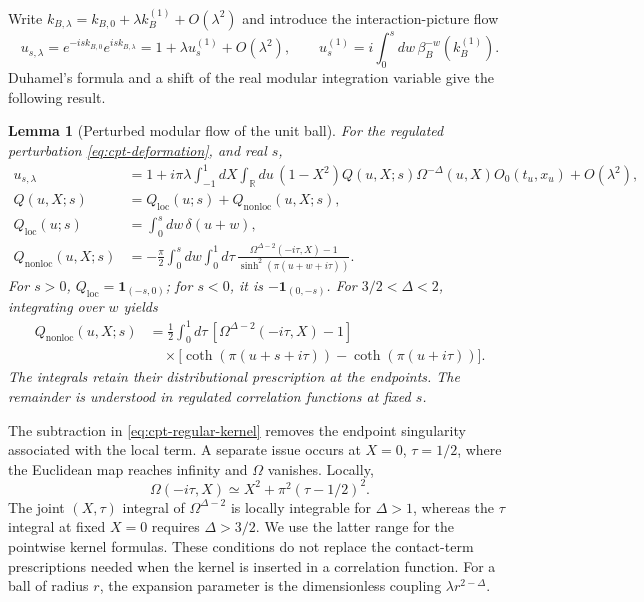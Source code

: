\documentclass[a4paper,11pt]{article}
\newtheorem{lemma}[theorem]{Lemma}
\theoremstyle{definition}
\begin{document}
Write $k_{B,\lambda}=k_{B,0}+\lambda k_B^{(1)}+O(\lambda^2)$ and introduce the interaction-picture flow
\begin{equation}
 u_{s,\lambda}=e^{-is k_{B,0}}e^{is k_{B,\lambda}}
 =1+\lambda u_s^{(1)}+O(\lambda^2),
 \qquad u_s^{(1)}=i\int_0^s dw\,\beta_B^{-w}(k_B^{(1)}).
 \label{eq:cpt-interaction-flow}
\end{equation}
Duhamel's formula and a shift of the real modular integration variable give the following result.
\begin{lemma}[Perturbed modular flow of the unit ball]
\label{lem:cpt-ball-flow}
For the regulated perturbation \eqref{eq:cpt-deformation}, and real $s$,
\begin{align}
 u_{s,\lambda}&=1+i\pi\lambda\int_{-1}^1dX\int_{\mathbb R}du\,
 (1-X^2)Q(u,X;s)\Omega^{-\Delta}(u,X)O_0(t_u,x_u)
 +O(\lambda^2),\label{eq:cpt-flow-correction}\\
 Q(u,X;s)&=Q_{\mathrm{loc}}(u;s)+Q_{\mathrm{nonloc}}(u,X;s),\nonumber\\
 Q_{\mathrm{loc}}(u;s)&=\int_0^s dw\,\delta(u+w),\nonumber\\
 Q_{\mathrm{nonloc}}(u,X;s)&=-\frac{\pi}{2}\int_0^s dw\int_0^1d\tau\,
 \frac{\Omega^{\Delta-2}(-i\tau,X)-1}{\sinh^2(\pi(u+w+i\tau))}.
 \label{eq:cpt-Q-kernel}
\end{align}
For $s>0$, $Q_{\mathrm{loc}}=\mathbf 1_{(-s,0)}$; for $s<0$, it is $-\mathbf 1_{(0,-s)}$. For $3/2<\Delta<2$, integrating over $w$ yields
\begin{align}
 Q_{\mathrm{nonloc}}(u,X;s)
 &=\frac12\int_0^1d\tau\,[\Omega^{\Delta-2}(-i\tau,X)-1]\nonumber\\
 &\quad\times\bigl[\coth(\pi(u+s+i\tau))-\coth(\pi(u+i\tau))\bigr].
 \label{eq:cpt-Q-coth}
\end{align}
The integrals retain their distributional prescription at the endpoints. The remainder is understood in regulated correlation functions at fixed $s$.
\end{lemma}

The subtraction in \eqref{eq:cpt-regular-kernel} removes the endpoint singularity associated with the local term. A separate issue occurs at $X=0$, $\tau=1/2$, where the Euclidean map reaches infinity and $\Omega$ vanishes. Locally,
\[
 \Omega(-i\tau,X)\simeq X^2+\pi^2(\tau-1/2)^2.
\]
The joint $(X,\tau)$ integral of $\Omega^{\Delta-2}$ is locally integrable for $\Delta>1$, whereas the $\tau$ integral at fixed $X=0$ requires $\Delta>3/2$. We use the latter range for the pointwise kernel formulas. These conditions do not replace the contact-term prescriptions needed when the kernel is inserted in a correlation function. For a ball of radius $r$, the expansion parameter is the dimensionless coupling $\lambda r^{2-\Delta}$.
\end{document}
